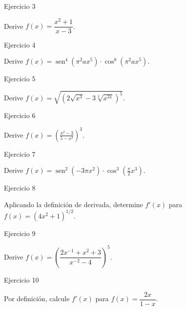 \documentclass[aspectratio=169]{beamer}
\begin{document}
\begin{frame}{Ejercicio 3}
  \begin{mwejercicio}
    Derive $f(x) = \dfrac{x^2 + 1}{x - 3}$.
  \end{mwejercicio}
\end{frame}

\begin{frame}{Ejercicio 4}
  \begin{mwejercicio}
    Derive $f(x) = \operatorname{sen}^4(\pi^2 a x^5)\cdot\cos^8(\pi^2 a x^5)$.
  \end{mwejercicio}
\end{frame}

\begin{frame}{Ejercicio 5}
  \begin{mwejercicio}
    Derive $f(x) = \sqrt{\left(2\sqrt{x^3} - 3\sqrt[3]{x^{31}}\right)^5}$.
  \end{mwejercicio}
\end{frame}

\begin{frame}{Ejercicio 6}
  \begin{mwejercicio}
    Derive $f(x) = \left(\frac{x^2 - 3}{5 - x^2}\right)^3$.
  \end{mwejercicio}
\end{frame}

\begin{frame}{Ejercicio 7}
  \begin{mwejercicio}
    Derive $f(x) = \operatorname{sen}^2(-3\pi x^2)\cdot\cos^3\left(\frac{\pi}{2}x^3\right)$.
  \end{mwejercicio}
\end{frame}

\begin{frame}{Ejercicio 8}
  \begin{mwejercicio}
    Aplicando la definición de derivada, determine $f'(x)$ para $f(x) = (4x^2 + 1)^{1/2}$.
  \end{mwejercicio}
\end{frame}

\begin{frame}{Ejercicio 9}
  \begin{mwejercicio}
    Derive $f(x) = \left(\dfrac{2x^{-1} + x^2 + 3}{x^{-2} - 4}\right)^{5}$.
  \end{mwejercicio}
\end{frame}

\begin{frame}{Ejercicio 10}
  \begin{mwejercicio}
    Por definición, calcule $f'(x)$ para $f(x) = \dfrac{2x}{1-x}$.
  \end{mwejercicio}
\end{frame}
\end{document}
